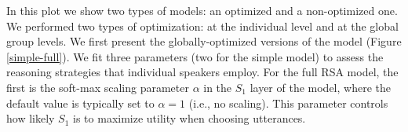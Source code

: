 \documentclass[10pt,a4paper]{article}
\begin{document}
In this plot we show two types of models: an optimized and a non-optimized one.
We performed two types of optimization: at the individual level and at the global group levels. We first present the globally-optimized versions of the model (Figure \ref{simple-full}). We fit three parameters (two for the simple model) to assess the reasoning strategies that individual speakers employ.
For the full RSA model, the first is the soft-max scaling parameter $\alpha$ in the $S_1$ layer of the model, where the default value is typically set to $\alpha=1$ (i.e., no scaling). 
This parameter controls how likely $S_1$ is to maximize utility when choosing utterances. 
\end{document}
